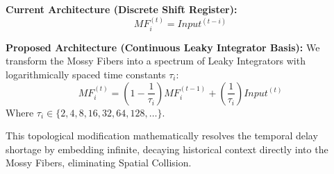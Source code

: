\documentclass[11pt,a4paper]{article}
\begin{document}
\textbf{Current Architecture (Discrete Shift Register):}
\[ MF_i^{(t)} = Input^{(t - i)} \]

\textbf{Proposed Architecture (Continuous Leaky Integrator Basis):}
We transform the Mossy Fibers into a spectrum of Leaky Integrators with logarithmically spaced time constants $\tau_i$:
\[ MF_i^{(t)} = \left(1 - \frac{1}{\tau_i}\right) MF_i^{(t-1)} + \left(\frac{1}{\tau_i}\right) Input^{(t)} \]
Where $\tau_i \in \{2, 4, 8, 16, 32, 64, 128, \dots\}$. 

This topological modification mathematically resolves the temporal delay shortage by embedding infinite, decaying historical context directly into the Mossy Fibers, eliminating Spatial Collision.
\end{document}
